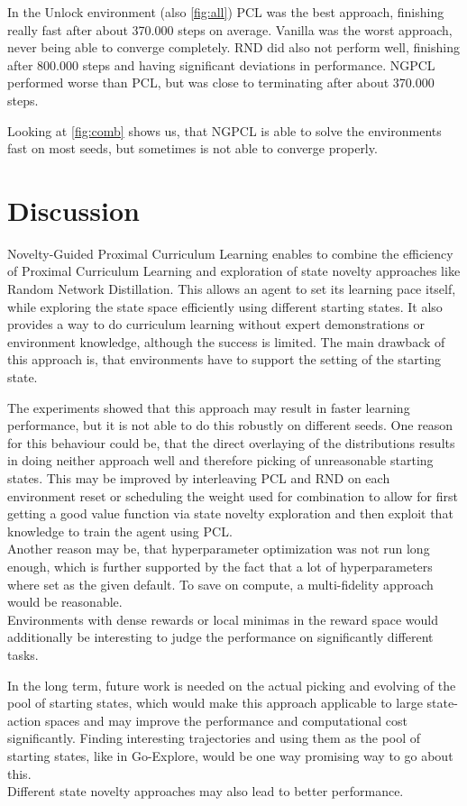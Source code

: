 \documentclass{article}
\begin{document}
In the Unlock environment (also \cref{fig:all}) PCL was the best approach, finishing really fast after about 370.000 steps on average. Vanilla was the worst approach, never being able to converge completely. RND did also not perform well, finishing after 800.000 steps and having significant deviations in performance. NGPCL performed worse than PCL, but was close to terminating after about 370.000 steps.

Looking at \cref{fig:comb} shows us, that NGPCL is able to solve the environments fast on most seeds, but sometimes is not able to converge properly.


\section{Discussion}
Novelty-Guided Proximal Curriculum Learning enables to combine the efficiency of Proximal Curriculum Learning and exploration of state novelty approaches like Random Network Distillation. This allows an agent to set its learning pace itself, while exploring the state space efficiently using different starting states. It also provides a way to do curriculum learning without expert demonstrations or environment knowledge, although the success is limited. The main drawback of this approach is, that environments have to support the setting of the starting state.

The experiments showed that this approach may result in faster learning performance, but it is not able to do this robustly on different seeds. 
One reason for this behaviour could be, that the direct overlaying of the distributions results in doing neither approach well and therefore picking of unreasonable starting states. This may be improved by interleaving PCL and RND on each environment reset or scheduling the weight used for combination to allow for first getting a good value function via state novelty exploration and then exploit that knowledge to train the agent using PCL. \\
Another reason may be, that hyperparameter optimization was not run long enough, which is further supported by the fact that a lot of hyperparameters where set as the given default. To save on compute, a multi-fidelity approach would be reasonable. \\
Environments with dense rewards or local minimas in the reward space would additionally be interesting to judge the performance on significantly different tasks.

In the long term, future work is needed on the actual picking and evolving of the pool of starting states, which would make this approach applicable to large state-action spaces and may improve the performance and computational cost significantly. Finding interesting trajectories and using them as the pool of starting states, like in Go-Explore, would be one way promising way to go about this. \\
Different state novelty approaches may also lead to better performance.


\newpage


\end{document}
